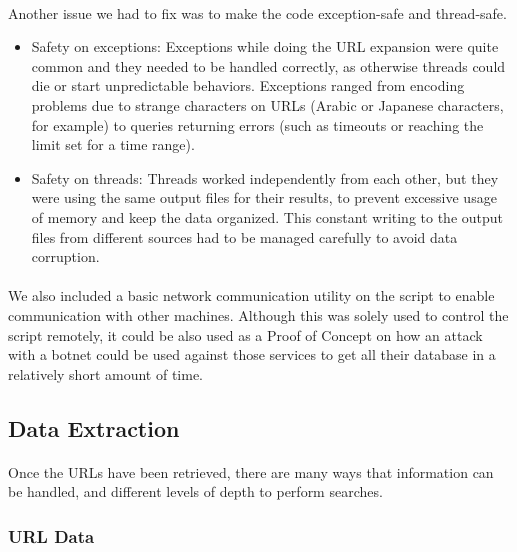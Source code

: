 \documentclass[12pt]{article}
\begin{document}
\paragraph{}
Another issue we had to fix was to make the code exception-safe and thread-safe.

\begin{itemize}

\item  Safety on exceptions: Exceptions while doing the URL expansion were quite common and they needed to be handled correctly, as otherwise threads could die or start unpredictable behaviors. Exceptions ranged from encoding problems due to strange characters on URLs (Arabic or Japanese characters, for example) to queries returning errors (such as timeouts or reaching the limit set for a time range).

\item  Safety on threads: Threads worked independently from each other, but they were using the same output files for their results, to prevent excessive usage of memory and keep the data organized. This constant writing to the output files from different sources had to be managed carefully to avoid data corruption.

\end{itemize}

\paragraph{}
We also included a basic network communication utility on the script to enable communication with other machines. Although this was solely used to control the script remotely, it could be also used as a Proof of Concept on how an attack with a botnet could be used against those services to get all their database in a relatively short amount of time.

\subsection{Data Extraction}

\paragraph{}
Once the URLs have been retrieved, there are many ways that information can be handled, and different levels of depth to perform searches.

\subsubsection{URL Data}
\end{document}

